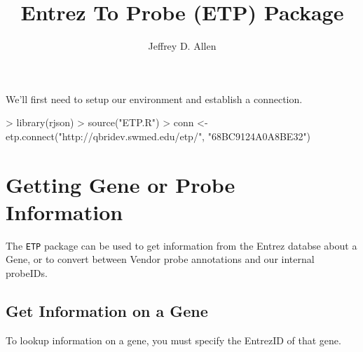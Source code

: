 \documentclass[a4paper]{article}
\begin{document}
\title{Entrez To Probe (ETP) Package}
\author{Jeffrey D. Allen}

\maketitle

We'll first need to setup our environment and establish a connection.

\begin{Schunk}
\begin{Sinput}
> library(rjson)
> source("ETP.R")
> conn <- etp.connect("http://qbridev.swmed.edu/etp/", "68BC9124A0A8BE32")
\end{Sinput}
\end{Schunk}

\section{Getting Gene or Probe Information}

The \verb/ETP/ package can be used to get information from the Entrez databse about a Gene, or to convert between Vendor probe annotations and our internal probeIDs.

\subsection{Get Information on a Gene}

To lookup information on a gene, you must specify the EntrezID of that gene.
\end{document}
